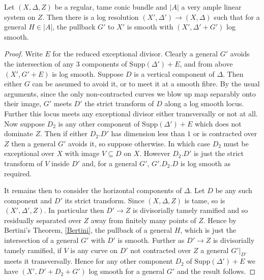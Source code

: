 \begin{theorem}
	Let $(X,\Delta,Z)$ be a regular, tame conic bundle and $|A|$ a very ample linear system on $Z$. Then there is a log resolution $(X',\Delta') \to (X,\Delta)$ such that for a general $H \in |A|$, the pullback $G'$ to $X'$ is smooth with $(X',\Delta'+G')$ log smooth. 
\end{theorem}
\begin{proof}
	Write $E$ for the reduced exceptional divisor.
	Clearly a general $G'$ avoids the intersection of any $3$ components of $\text{Supp}(\Delta')+E$, and from above $(X',G'+E)$ is log smooth. Suppose $D$ is a vertical component of $\Delta$. Then either $G$ can be assumed to avoid it, or to meet it at a smooth fibre. By the usual arguments, since the only non-contracted curves we blow up map separably onto their image, $G'$ meets $D'$ the strict transform of $D$ along a log smooth locus. Further this locus meets any exceptional divisor either transversally or not at all. Now suppose $D_{2}$ is any other component of $\text{Supp}(\Delta')+E$ which does not dominate $Z$. Then if either $D_{2}.D'$ has dimension less than $1$ or is contracted over $Z$ then a general $G'$ avoids it, so suppose otherwise. In which case $D_{2}$ must be exceptional over $X$ with image $V\subseteq D$ on $X$. However $D_{2}.D'$ is just the strict transform of $V$ inside $D'$ and, for a general $G'$, $G'.D_{2}.D$ is log smooth as required. 
	
	It remains then to consider the horizontal components of $\Delta$. Let $D$ be any such component and $D'$ its strict transform. Since $(X,\Delta,Z)$ is tame, so is $(X',\Delta',Z)$. In particular then $D' \to Z$ is divisorially tamely ramified and so residually separated over $Z$ away from finitely many points of $Z$. Hence by Bertini's Theorem, \autoref{Bertini}, the pullback of a general $H$, which is just the intersection of a general $G'$ with $D'$ is smooth. Further as $D' \to Z$ is divisorially tamely ramified, if $V$ is any curve on $D'$ not contracted over $Z$ a general $G'|_{D'}$ meets it transversally. Hence for any other component $D_{2}$ of $\text{Supp}(\Delta')+E$ we have $(X',D'+D_{2}+G')$ log smooth for a general $G'$ and the result follows.
\end{proof}

